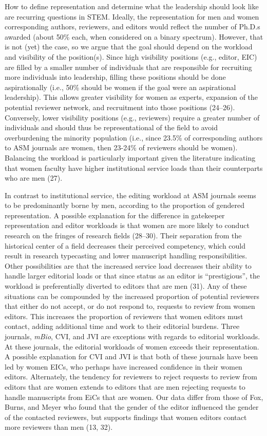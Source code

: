 \documentclass[11pt,]{article}
\begin{document}
How to define representation and determine what the leadership should
look like are recurring questions in STEM. Ideally, the representation
for men and women corresponding authors, reviewers, and editors would
reflect the number of Ph.D.s awarded (about 50\% each, when considered
on a binary spectrum). However, that is not (yet) the case, so we argue
that the goal should depend on the workload and visibility of the
position(s). Since high visibility positions (e.g., editor, EIC) are
filled by a smaller number of individuals that are responsible for
recruiting more individuals into leadership, filling these positions
should be done aspirationally (i.e., 50\% should be women if the goal
were an aspirational leadership). This allows greater visibility for
women as experts, expansion of the potential reviewer network, and
recruitment into those positions (24--26). Conversely, lower visibility
positions (e.g., reviewers) require a greater number of individuals and
should thus be representational of the field to avoid overburdening the
minority population (i.e., since 23.5\% of corresponding authors to ASM
journals are women, then 23-24\% of reviewers should be women).
Balancing the workload is particularly important given the literature
indicating that women faculty have higher institutional service loads
than their counterparts who are men (27).

In contrast to institutional service, the editing workload at ASM
journals seems to be predominantly borne by men, according to the
proportion of gendered representation. A possible explanation for the
difference in gatekeeper representation and editor workloads is that
women are more likely to conduct research on the fringes of research
fields (28--30). Their separation from the historical center of a field
decreases their perceived competency, which could result in research
typecasting and lower manuscript handling responsibilities. Other
possibilities are that the increased service load decreases their
ability to handle larger editorial loads or that since status as an
editor is ``prestigious'', the workload is preferentially diverted to
editors that are men (31). Any of these situations can be compounded by
the increased proportion of potential reviewers that either do not
accept, or do not respond to, requests to review from women editors.
This increases the proportion of reviewers that women editors must
contact, adding additional time and work to their editorial burdens.
Three journals, \emph{mBio}, CVI, and JVI are exceptions with regards to
editorial workloads. At these journals, the editorial workloads of women
exceeds their representation. A possible explanation for CVI and JVI is
that both of these journals have been led by women EICs, who perhaps
have increased confidence in their women editors. Alternately, the
tendency for reviewers to reject requests to review from editors that
are women extends to editors that are men rejecting requests to handle
manuscripts from EiCs that are women. Our data differ from those of Fox,
Burns, and Meyer who found that the gender of the editor influenced the
gender of the contacted reviewers, but supports findings that women
editors contact more reviewers than men (13, 32).
\end{document}
